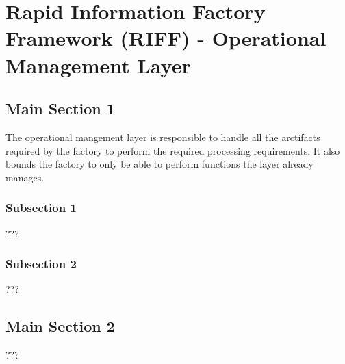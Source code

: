 
\chapter{Rapid Information Factory Framework (RIFF) - Operational Management Layer} %

\label{Chapter17} %



\section{Main Section 1}

The operational mangement layer is responsible to handle all the arctifacts required by the factory to perform the required processing requirements. It also bounds the factory to only be able to perform functions the layer already manages.

\subsection{Subsection 1}

???


\subsection{Subsection 2}

???


\section{Main Section 2}

???
